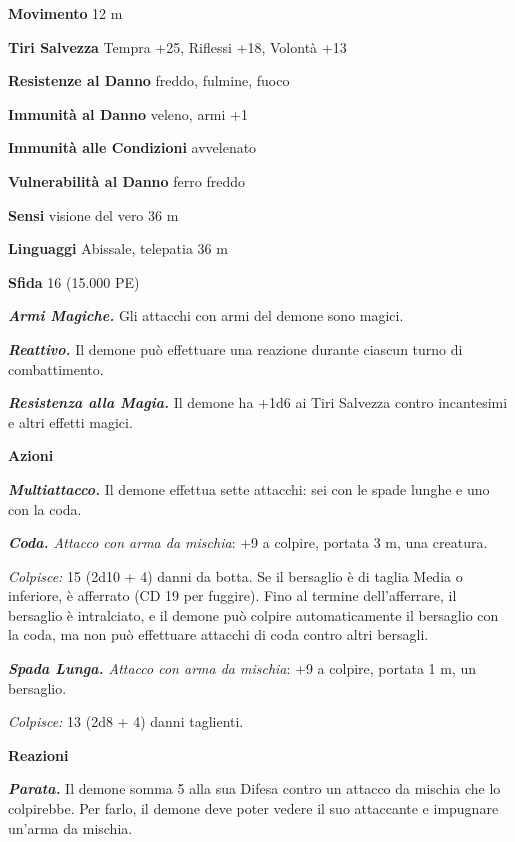 \begin{multicols}{2}
\textbf{Movimento} 12 m

\textbf{Tiri Salvezza} Tempra +25, Riflessi +18, Volontà +13

\textbf{Resistenze al Danno} freddo, fulmine, fuoco

\textbf{Immunità al Danno} veleno, armi +1

\textbf{Immunità alle Condizioni} avvelenato

\textbf{Vulnerabilità al Danno} ferro freddo

\textbf{Sensi} visione del vero 36 m

\textbf{Linguaggi} Abissale, telepatia 36 m 

\textbf{Sfida} 16 (15.000 PE)

\emph{\textbf{Armi Magiche.}} Gli attacchi con armi del demone sono magici.

\emph{\textbf{Reattivo.}} Il demone può effettuare una reazione durante ciascun turno di combattimento.

\emph{\textbf{Resistenza alla Magia.}} Il demone ha +1d6 ai Tiri Salvezza contro incantesimi e altri effetti magici.

\textbf{Azioni}

\emph{\textbf{Multiattacco.}} Il demone effettua sette attacchi: sei con le spade lunghe e uno con la coda.

\emph{\textbf{Coda.} Attacco con arma da mischia}: +9 a colpire, portata 3 m, una creatura.

\emph{Colpisce:} 15 (2d10 + 4) danni da botta. Se il bersaglio è di taglia Media o inferiore, è afferrato (CD 19 per fuggire). Fino al termine dell'afferrare, il bersaglio è intralciato, e il demone può colpire automaticamente il bersaglio con la coda, ma non può effettuare attacchi di coda contro altri bersagli.

\emph{\textbf{Spada Lunga.} Attacco con arma da mischia}: +9 a colpire, portata 1 m, un bersaglio.

\emph{Colpisce:} 13 (2d8 + 4) danni taglienti.

\textbf{Reazioni}

\emph{\textbf{Parata.}} Il demone somma 5 alla sua Difesa contro un attacco da mischia che lo colpirebbe. Per farlo, il demone deve poter vedere il suo attaccante e impugnare un'arma da mischia.


\end{multicols}
